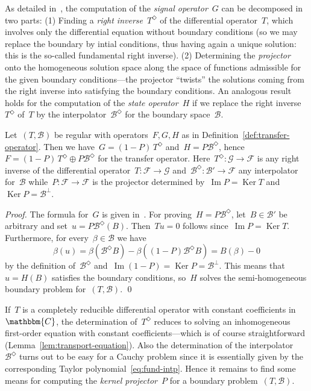 \documentclass[a4paper]{llncs}
\let\mathbb\mathbbm
\newcommand{\CC}{\mathbb{C}}
\renewcommand{\ker}{\operatorname{Ker}}
\newcommand{\im}{\operatorname{Im}}
\newcommand{\orth}[1]{#1^\perp}
\newcommand{\fri}[1]{#1^\Diamond}
\newcommand{\galg}{\mathcal{F}}
\newcommand{\ogalg}{\mathcal{G}}
\newcommand{\bspc}{\mathcal{B}}
\newenvironment{myproof}{\begin{proof}}{\qed\end{proof}}
\begin{document}
As detailed in~\cite{Rosenkranz2005,RegensburgerRosenkranz2009}, the computation
of the \emph{signal operator}~$G$ can be decomposed in two parts: (1) Finding a
\emph{right inverse}~$\fri{T}$ of the differential operator~$T$, which involves
only the differential equation without boundary conditions (so we may replace
the boundary by intial conditions, thus having again a unique solution: this is
the so-called fundamental right inverse). (2) Determining the \emph{projector}
onto the homogeneous solution space along the space of functions admissible for
the given boundary conditions---the projector ``twists'' the solutions coming
from the right inverse into satisfying the boundary conditions. An analogous
result holds for the computation of the \emph{state operator}~$H$ if we replace
the right inverse~$\fri{T}$ of~$T$ by the interpolator~$\fri{\bspc}$ for the
boundary space~$\bspc$.

\begin{myproposition}
  \label{prop:proj-transfer}
  Let~$(T, \bspc)$ be regular with operators~$F, G, H$ as in
  Definition~\ref{def:transfer-operator}. Then we have~$G = (1-P) \, \fri{T}$
  and~$H = P \fri{\bspc}$, hence~$F = (1-P) \, \fri{T} \oplus P \fri{\bspc}$ for
  the transfer operator.  Here~$\fri{T}\colon \ogalg \to \galg$ is any right
  inverse of the differential operator~$T\colon \galg \to \ogalg$
  and~$\fri{\bspc}\colon \bspc' \to \galg$ any interpolator for~$\bspc$
  while~$P\colon \galg \to \galg$ is the projector determined by~$\im{P} =
  \ker{T}$ and~$\ker{P} = \orth{\bspc}$.
\end{myproposition}
\begin{myproof}
  The formula for~$G$ is given in~\cite[(2.3)]{RegensburgerRosenkranz2009}. For
  proving~$H = P \fri{\bspc}$, let~$B \in \bspc'$ be arbitrary and set~$u = P
  \fri{\bspc}(B)$. Then~$Tu=0$ follows since~$\im{P} = \ker{T}$. Furthermore,
  for every~$\beta \in \bspc$ we have
\begin{equation*}
    \beta(u) = \beta(\fri{\bspc} \! B) - \beta((1-P) \fri{\bspc} \! B) =
    B(\beta) - 0
  \end{equation*}
by the definition of~$\fri{\bspc}$ and~$\im(1-P) = \ker{P} =
  \orth{\bspc}$. This means that~$u = H(B)$ satisfies the boundary conditions,
  so~$H$ solves the semi-homogeneous boundary problem for~$(T, \bspc)$.
\end{myproof}

If~$T$ is a completely reducible differential operator with constant
coefficients in~$\CC$, the determination of~$\fri{T}$ reduces to solving an
inhomogeneous first-order equation with constant coefficients---which is of
course straightforward (Lemma~\ref{lem:transport-equation}). Also the
determination of the interpolator~$\fri{\bspc}$ turns out to be easy for a
Cauchy problem since it is essentially given by the corresponding Taylor
polynomial~\eqref{eq:fund-intp}. Hence it remains to find some means for
computing the \emph{kernel projector}~$P$ for a boundary problem~$(T, \bspc)$.
\end{document}

